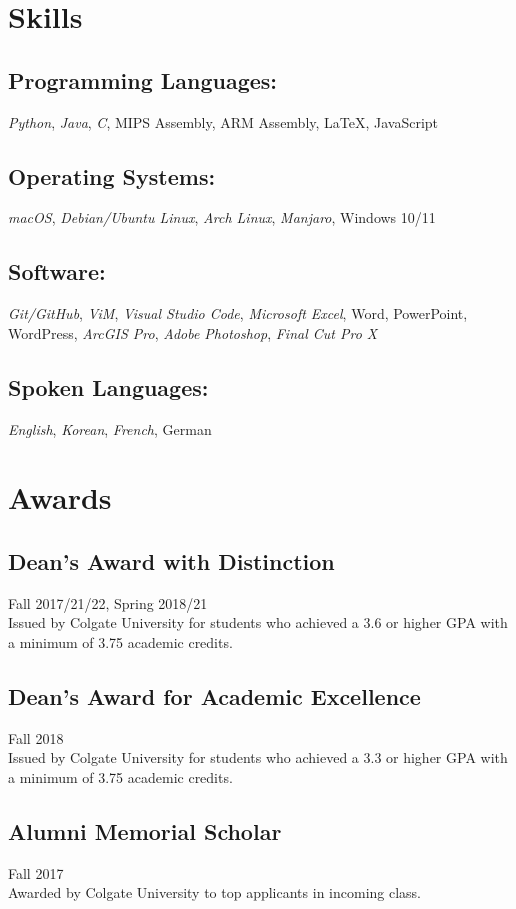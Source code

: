 \documentclass[10pt, letterpaper]{article}
\begin{document}
\section{Skills}
\subsection{Programming Languages: } \emph{ Python}, \emph{Java}, \emph{C}, MIPS Assembly, ARM Assembly, \LaTeX, JavaScript
\subsection{Operating Systems: } \emph{ macOS}, \emph{Debian/Ubuntu Linux}, \emph{Arch Linux}, \emph{Manjaro}, Windows 10/11
\subsection{Software: } \emph{ Git/GitHub}, \emph{ViM}, \emph{Visual Studio Code}, \emph{Microsoft Excel}, Word, PowerPoint,  WordPress, \emph{ArcGIS Pro}, \emph{Adobe Photoshop}, \emph{Final Cut Pro X}
\subsection{Spoken Languages: } \emph{ English}, \emph{Korean}, \emph{French}, German
\section{Awards}
\subsection{Dean's Award with Distinction} \hfill Fall 2017/21/22, Spring 2018/21\\
Issued by Colgate University for students who achieved a 3.6 or higher GPA with a minimum of 3.75 academic credits.

\subsection{Dean's Award for Academic Excellence} \hfill Fall 2018\\
Issued by Colgate University for students who achieved a 3.3 or higher GPA with a minimum of 3.75 academic credits.

\subsection{Alumni Memorial Scholar} \hfill Fall 2017\\
Awarded by Colgate University to top applicants in incoming class.
\end{document}

